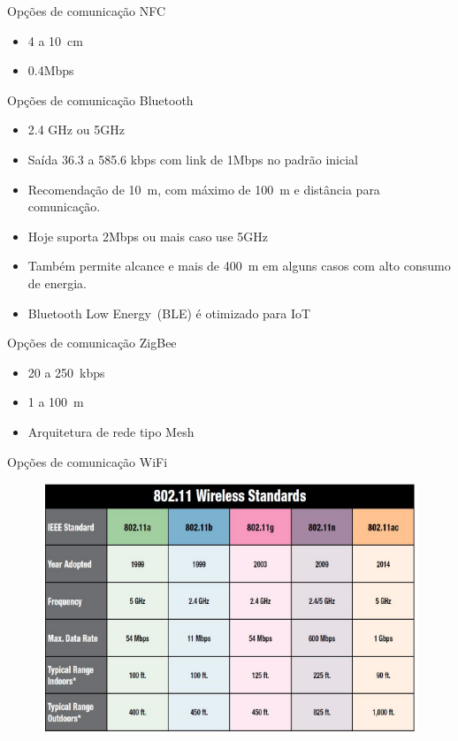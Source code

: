 \documentclass[t]{beamer}
\begin{document}
\begin{frame}{Opções de comunicação}
NFC
\begin{itemize}
	\item 4 a 10~cm
	\item 0.4Mbps
\end{itemize}
\end{frame}

\begin{frame}{Opções de comunicação}
Bluetooth
\begin{itemize}
	\item 2.4 GHz ou 5GHz
	\item Saída 36.3 a 585.6 kbps com link de 1Mbps no padrão inicial
	\item Recomendação de 10~m, com máximo de 100~m e distância para comunicação.
	\item Hoje suporta 2Mbps ou mais caso use 5GHz
	\item Também permite alcance e mais de 400~m em alguns casos com alto consumo de energia.
	\item Bluetooth Low Energy~(BLE) é otimizado para IoT
\end{itemize}
\end{frame}


\begin{frame}{Opções de comunicação}
ZigBee
\begin{itemize}
	\item 20 a 250~kbps
	\item 1 a 100~m
	\item Arquitetura de rede tipo Mesh
\end{itemize}
\end{frame}

\begin{frame}{Opções de comunicação}
WiFi
\begin{figure}
	\includegraphics[width=\linewidth]{wirelessstandards}
\end{figure}
\end{frame}
\end{document}
